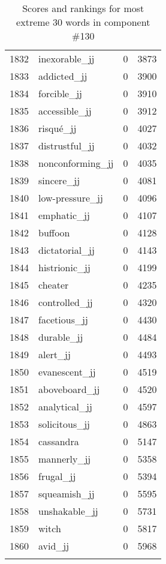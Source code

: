 \begin{longtable}[!htbp]{| rlr@{.}l |}
    1832 & inexorable\_jj & 0 & 3873 \\
    1833 & addicted\_jj & 0 & 3900 \\
    1834 & forcible\_jj & 0 & 3910 \\
    1835 & accessible\_jj & 0 & 3912 \\
    1836 & risqué\_jj & 0 & 4027 \\
    1837 & distrustful\_jj & 0 & 4032 \\
    1838 & nonconforming\_jj & 0 & 4035 \\
    1839 & sincere\_jj & 0 & 4081 \\
    1840 & low-pressure\_jj & 0 & 4096 \\
    1841 & emphatic\_jj & 0 & 4107 \\
    1842 & buffoon & 0 & 4128 \\
    1843 & dictatorial\_jj & 0 & 4143 \\
    1844 & histrionic\_jj & 0 & 4199 \\
    1845 & cheater & 0 & 4235 \\
    1846 & controlled\_jj & 0 & 4320 \\
    1847 & facetious\_jj & 0 & 4430 \\
    1848 & durable\_jj & 0 & 4484 \\
    1849 & alert\_jj & 0 & 4493 \\
    1850 & evanescent\_jj & 0 & 4519 \\
    1851 & aboveboard\_jj & 0 & 4520 \\
    1852 & analytical\_jj & 0 & 4597 \\
    1853 & solicitous\_jj & 0 & 4863 \\
    1854 & cassandra & 0 & 5147 \\
    1855 & mannerly\_jj & 0 & 5358 \\
    1856 & frugal\_jj & 0 & 5394 \\
    1857 & squeamish\_jj & 0 & 5595 \\
    1858 & unshakable\_jj & 0 & 5731 \\
    1859 & witch & 0 & 5817 \\
    1860 & avid\_jj & 0 & 5968 \\
    \hline
    \caption{Scores and rankings for most extreme 30 words in component \#130} \\
\end{longtable}
